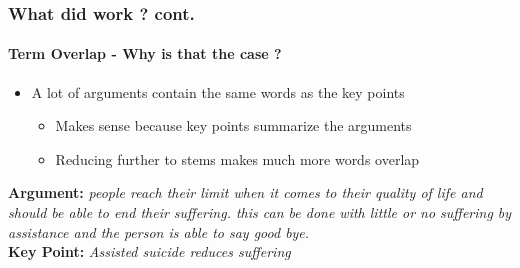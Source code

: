 \documentclass[english,handout]{mlutalk}
\begin{document}
\begin{frame}
  \frametitle{What did work ? cont.}
  \framesubtitle{Term Overlap - Why is that the case ?}
    
    \begin{itemize}
      \item A lot of arguments contain the same words as the key points
        \begin{itemize}
          \item Makes sense because key points summarize the arguments
          \item Reducing further to stems makes much more words overlap
        \end{itemize}
    \end{itemize}

    \begin{example}
      \textbf{Argument:} \textit{people reach their limit when it comes to their quality of life and should be able to end their suffering. this can be done with little or no suffering by assistance and the person is able to say good bye.}\\
      \textbf{Key Point:} \textit{Assisted suicide reduces suffering}
    \end{example}

\end{frame}

\begin{frame}
  \begin{figure}
    \centering
  \end{figure}
\end{frame}
\end{document}
